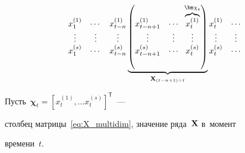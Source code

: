 \begin{equation}

\label{eq:X_multidim}

\begin{matrix}

x_{1}^{(1)} & \cdots & x_{t - n}^{(1)} \\

\vdots & \vdots& \vdots \\

x_{1}^{(s)} & \cdots & x_{t - n}^{(s)}

\end{matrix}

\underbrace{

\left( \begin{matrix}

x^{(1)}_{t - n + 1} & \cdots \\

\vdots &\vdots\\

x^{(s)}_{t - n + 1} & \cdots

\end{matrix} \; \; \overbrace{\begin{matrix}

x^{(1)}_{t}\\

\vdots \\

x^{(s)}_{t}

\end{matrix}}^{{\bm \chi}_t}

\right)}_{{\bf X}_{(t - n + 1) \div t}}

\begin{matrix}

x_{t}^{(1)} & \cdots \\

\vdots &\vdots\\

x_{t}^{(s)} & \cdots

\end{matrix}

\end{equation}





Пусть~${\bm \chi}_t = \left[ x^{(1)}_t, \ldots x^{(s)}_t\right]^{\mathsf{T}}$~--- 

столбец матрицы~\eqref{eq:X_multidim}, значение ряда~${\bf X}$ в~момент 

времени~$t$.

